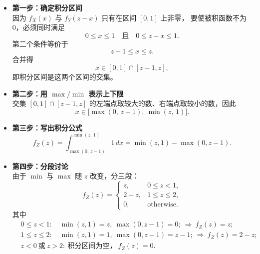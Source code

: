 \begin{itemize}
  \item \textbf{第一步：确定积分区间}\\
  因为 $f_X(x)$ 与 $f_Y(z-x)$ 只有在区间 $[0,1]$ 上非零，
  要使被积函数不为 $0$，必须同时满足
  \[
  0\le x\le 1 \quad\text{且}\quad 0\le z-x\le 1.
  \]
  第二个条件等价于
  \[
  z-1\le x\le z.
  \]
  合并得
  \[
  x\in[0,1]\cap[z-1,z],
  \]
  即积分区间是这两个区间的交集。

  \item \textbf{第二步：用 $\max/\min$ 表示上下限}\\
  交集 $[0,1]\cap[z-1,z]$ 的左端点取较大的数、右端点取较小的数，因此
  \[
  x\in\bigl[\max(0,\,z-1),\ \min(z,\,1)\bigr].
  \]

  \item \textbf{第三步：写出积分公式}\\
  \[
  f_Z(z)=\int_{\max(0,\,z-1)}^{\min(z,\,1)} 1\,dx
  =\min(z,1)-\max(0,z-1).
  \]

  \item \textbf{第四步：分段讨论}\\
  由于 $\min$ 与 $\max$ 随 $z$ 改变，分三段：
  \[
  f_Z(z)=
  \begin{cases}
    z, & 0\le z<1,\\[4pt]
    2-z, & 1\le z\le 2,\\[4pt]
    0, & \text{otherwise}.
  \end{cases}
  \]
  其中
  \[
  \begin{aligned}
  &0\le z<1:\quad \min(z,1)=z,\ \max(0,z-1)=0;\ \Rightarrow\ f_Z(z)=z;\\
  &1\le z\le 2:\quad \min(z,1)=1,\ \max(0,z-1)=z-1;\ \Rightarrow\ f_Z(z)=2-z;\\
  &z<0\ \text{或}\ z>2:\ \text{积分区间为空，}\ f_Z(z)=0.
  \end{aligned}
  \]
\end{itemize}

